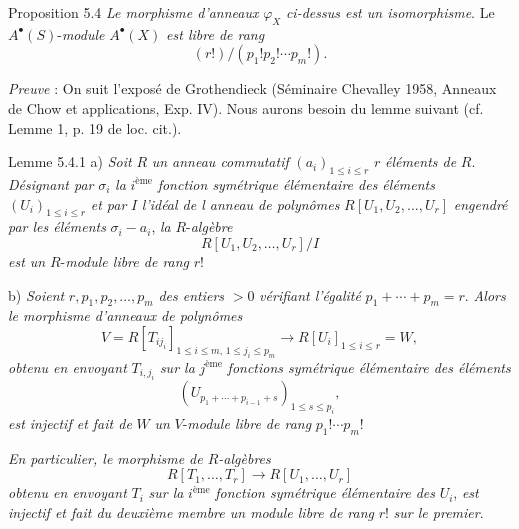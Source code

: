 \begin{statement}{Proposition 5.4}
\emph{Le morphisme d'anneaux} $\varphi_X$ \emph{ci-dessus est un isomorphisme}. Le $A^{\bullet}(S)$-\emph{module} $A^{\bullet}(X)$ \emph{est libre de rang}
\[
(r!)/(p_1!p_2!\cdots p_m!).
\]
\end{statement}

\emph{Preuve} : On
suit l'exposé de Grothendieck (Séminaire Chevalley 1958, Anneaux de Chow et applications, Exp. IV). Nous aurons besoin du lemme suivant (cf. Lemme 1, p. 19 de loc. cit.).

\begin{statement}{Lemme 5.4.1}
a) \emph{Soit} $R$ \emph{un anneau commutatif} $(a_i)_{1\le i\le r}$ $r$ \emph{éléments de} $R$. \emph{Désignant par} $\sigma_i$ \emph{la} $i^{\text{ème}}$ \emph{fonction symétrique élémentaire des éléments} $(U_i)_{1\le i\le r}$ \emph{et par} $I$ \emph{l'idéal de l anneau de polynômes} $R[U_1,U_2,\ldots,U_r]$ \emph{engendré par les éléments} $\sigma_i-a_i$, \emph{la} $R$-\emph{algèbre}
\[
R[U_1,U_2,\ldots,U_r]/I
\]
\emph{est un} $R$-\emph{module libre de rang} $r!$

b) \emph{Soient} $r,p_1,p_2,\ldots,p_m$ \emph{des entiers} $>0$ \emph{vérifiant l'égalité} $p_1+\cdots+p_m=r$. \emph{Alors le morphisme d'anneaux de polynômes}
\[
V=R[T_{ij_i}]_{1\le i\le m,\,1\le j_i\le p_m}
\longrightarrow R[U_i]_{1\le i\le r}=W,
\]
\emph{obtenu en envoyant} $T_{i,j_i}$ \emph{sur la} $j^{\text{ème}}$ \emph{fonctions symétrique élémentaire des éléments}
\[
(U_{p_1+\cdots+p_{i-1}+s})_{1\le s\le p_i},
\]
\emph{est injectif et fait de} $W$ \emph{un} $V$-\emph{module libre de rang} $p_1!\cdots p_m!$

\emph{En particulier, le morphisme de $R$-algèbres}
\[
R[T_1,\ldots,T_r]\to R[U_1,\ldots,U_r]
\]
\emph{obtenu en envoyant} $T_i$ \emph{sur la} $i^{\text{ème}}$ \emph{fonction symétrique élémentaire des} $U_i$, \emph{est injectif et fait du deuxième membre un module libre de rang} $r!$ \emph{sur le premier}.
\end{statement}

